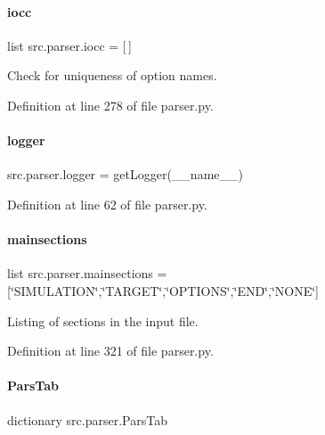 \paragraph{\texorpdfstring{iocc}{iocc}}
{\footnotesize\ttfamily list src.\+parser.\+iocc = \mbox{[}$\,$\mbox{]}}



Check for uniqueness of option names. 



Definition at line 278 of file parser.\+py.

\mbox{\label{namespacesrc_1_1parser_a37a64ec016ef29a383149466e0531dc2}} 
\paragraph{\texorpdfstring{logger}{logger}}
{\footnotesize\ttfamily src.\+parser.\+logger = get\+Logger(\+\_\+\+\_\+name\+\_\+\+\_\+)}



Definition at line 62 of file parser.\+py.

\mbox{\label{namespacesrc_1_1parser_a4ef62c5cd7d4749296b0cfeb4b3bd0e2}} 
\paragraph{\texorpdfstring{mainsections}{mainsections}}
{\footnotesize\ttfamily list src.\+parser.\+mainsections = \mbox{[}\char`\"{}S\+I\+M\+U\+L\+A\+T\+I\+ON\char`\"{},\char`\"{}T\+A\+R\+G\+ET\char`\"{},\char`\"{}O\+P\+T\+I\+O\+NS\char`\"{},\char`\"{}E\+ND\char`\"{},\char`\"{}N\+O\+NE\char`\"{}\mbox{]}}



Listing of sections in the input file. 



Definition at line 321 of file parser.\+py.

\mbox{\label{namespacesrc_1_1parser_a956ec0b198397b9f4ccd520ecf589be2}} 
\paragraph{\texorpdfstring{Pars\+Tab}{ParsTab}}
{\footnotesize\ttfamily dictionary src.\+parser.\+Pars\+Tab}

